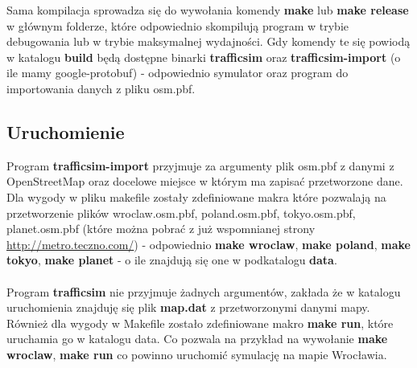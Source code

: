 \documentclass[12pt,leqno]{article}
\begin{document}
Sama kompilacja sprowadza się do wywołania komendy \textbf{make} lub
\textbf{make release} w głównym folderze, które odpowiednio skompilują
program w trybie debugowania lub w trybie maksymalnej wydajności.
Gdy komendy te się powiodą w katalogu \textbf{build} będą dostępne
binarki \textbf{trafficsim} oraz \textbf{trafficsim-import} (o ile
mamy google-protobuf) - odpowiednio symulator oraz program do importowania
danych z pliku osm.pbf. \\

\subsection{Uruchomienie}
Program \textbf{trafficsim-import} przyjmuje za argumenty plik osm.pbf
z danymi z OpenStreetMap oraz docelowe miejsce w którym ma zapisać
przetworzone dane. Dla wygody w pliku makefile zostały zdefiniowane
makra które pozwalają na przetworzenie plików wroclaw.osm.pbf,
poland.osm.pbf, tokyo.osm.pbf, planet.osm.pbf (które można pobrać
z już wspomnianej strony \url{http://metro.teczno.com/}) - odpowiednio
\textbf{make wroclaw}, \textbf{make poland}, \textbf{make tokyo},
\textbf{make planet} - o ile znajdują się one w podkatalogu \textbf{data}. \\ \\

Program \textbf{trafficsim} nie przyjmuje żadnych argumentów, zakłada
że w katalogu uruchomienia znajduję się plik \textbf{map.dat} z przetworzonymi
danymi mapy. Również dla wygody w Makefile zostało zdefiniowane makro
\textbf{make run}, które uruchamia go w katalogu data. Co pozwala na przykład
na wywołanie \textbf{make wroclaw}, \textbf{make run} co powinno uruchomić symulację
na mapie Wrocławia.
\end{document}
